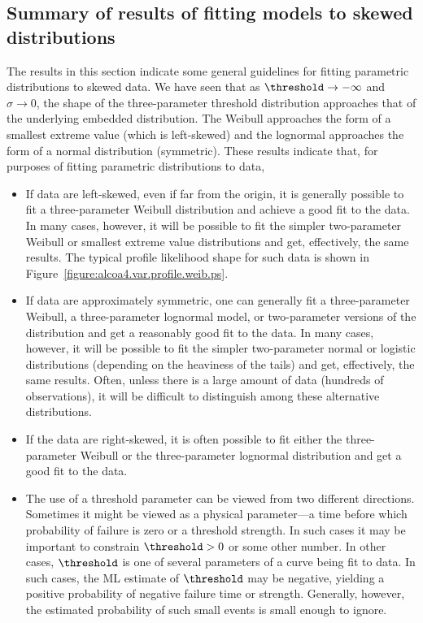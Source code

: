 \subsection{Summary of results  of fitting models to
skewed distributions}

The results in this section indicate some general guidelines for
fitting parametric distributions to skewed data.  We have seen that
as $\threshold \rightarrow -\infty$ and $\sigma
\rightarrow 0$, the shape of the three-parameter threshold
distribution approaches that of the underlying embedded distribution.
The Weibull approaches the form of a smallest extreme value (which is
left-skewed) and the lognormal approaches the form of a normal
distribution (symmetric).  These results indicate that, for purposes
of fitting parametric distributions to data,
\begin{itemize}
\item
If data are left-skewed, even if far from the origin, it is
generally possible to fit a three-parameter Weibull distribution and
achieve a good fit to the data. In many cases, however, it will be
possible to fit the simpler two-parameter Weibull or smallest
extreme value distributions and get, effectively, the same results.
The typical profile likelihood shape for such data is shown in
Figure~\ref{figure:alcoa4.var.profile.weib.ps}.
\item
If data are approximately symmetric, one can generally fit a
three-parameter Weibull, a three-parameter lognormal model, or
two-parameter versions of the distribution and get a reasonably good
fit to the data. In many cases, however, it will be possible to fit
the simpler two-parameter normal or logistic distributions
(depending on the heaviness of the tails) and get, effectively, the
same results.  Often, unless there is a large amount of data
(hundreds of observations), it will be difficult to distinguish
among these alternative distributions.
\item
If the data are right-skewed, it is often possible to fit either the
three-parameter Weibull or the three-parameter lognormal distribution and get
a good fit to the data.
\item
The use of a threshold parameter can be viewed from two different
directions.  Sometimes it might be viewed as a physical parameter---a
time before which probability of failure is zero or a threshold
strength. In such cases it may be important to constrain
$\threshold>0$ or some other number.  In other cases, $\threshold$ is
one of several parameters of a curve being fit to data. In such cases,
the ML estimate of $\threshold$ may be negative, yielding a positive
probability of negative failure time or strength. Generally, however,
the estimated probability of such small events is small enough to ignore.
\end{itemize}

